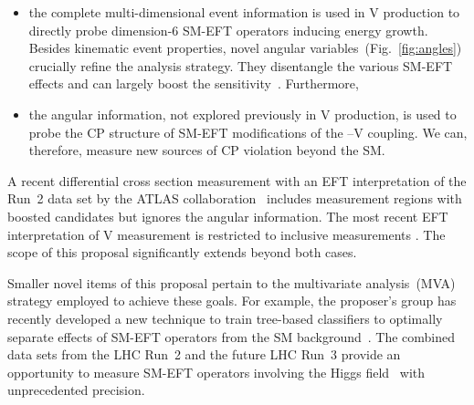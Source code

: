 \documentclass[a4paper,11pt]{article}
\newcommand{\Pb}{{{\Pqb}}\xspace}
\newcommand{\PAb}{{{{\Paqb}}}\xspace}
\renewcommand{\PV}{{{{V}}}\xspace}
\newcommand{\VH}{{{\PV}{\PH}}\xspace}
\begin{document}

\begin{itemize}

\item the complete multi-dimensional event information is used in \VH production to directly probe dimension-6 SM-EFT operators inducing energy growth.
Besides kinematic event properties, novel angular variables~(Fig.~\ref{fig:angles}) crucially refine the analysis strategy. 
They disentangle the various SM-EFT effects and can largely boost the sensitivity~\cite{CMS-PAS-SMP-20-005}. Furthermore, %

\item the angular information, not explored previously in \VH production, is used to probe the CP structure of SM-EFT modifications of the \PH--\PV coupling. We can, therefore, measure new sources of CP violation beyond the SM.
\end{itemize}

A recent differential cross section measurement with an EFT interpretation of the Run~2 data set by the ATLAS collaboration~\cite{ATLAS-CONF-2021-051} includes measurement regions with boosted \PH candidates but ignores the angular information. The most recent EFT interpretation of \VH measurement is restricted to inclusive measurements
\cite{CMS-PAS-HIG-19-005}. The scope of this proposal significantly extends beyond both cases.

Smaller novel items of this proposal pertain to the multivariate analysis~(MVA) strategy employed to achieve these goals. 
For example, the proposer's group has recently developed a new technique to train tree-based classifiers to optimally separate effects of SM-EFT operators from the SM background~\cite{Chatterjee:2021nms}.
The combined data sets from the LHC Run~2 and the future LHC Run~3 provide an opportunity to measure SM-EFT operators involving the Higgs field~\cite{Elias-Miro:2013mua,Gupta:2014rxa} with unprecedented precision.
\end{document}
